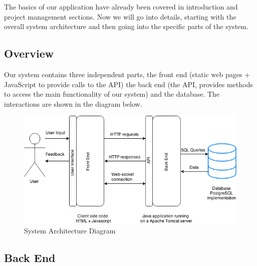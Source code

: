 \documentclass[10pt,a4paper]{article}
\begin{document}
The basics of our application have already been covered in introduction and 
project management sections. Now we will go into details, starting with the 
overall system architecture and then going into the specific parts of the 
system.

\subsection{Overview}

\noindent Our system contains three independent parts, the front end (static web 
pages + JavaScript to provide calls to the API) the back end (the API, provides 
methods to access the main functionality of our system) and the database. The 
interactions are shown in the diagram below.

\begin{figure}[H]
\centerline{\includegraphics[scale=0.58,trim=0 0 100 0]{sysarch}}
\caption{System Architecture Diagram}
\end{figure}    


\subsection{Back End}
\end{document}
